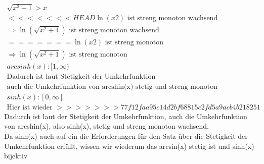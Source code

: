 \documentclass{HM}
\begin{document}
\begin{enumerate}
\begin{enumerate}
	\begin{align*}
		\sqrt{x^2+1} > x\\
<<<<<<< HEAD
		\ln(x2) \text{ ist streng monoton wachsend}\\
		\Rightarrow \ln(\sqrt{x^2+1})\text{ ist streng monoton wachsend}\\
=======
		\ln(x2) \text{ ist streng monoton}\\
		\Rightarrow \ln(\sqrt{x^2+1})\text{ ist streng monoton}\\
		arcsinh(x):[1,\infty)\\
		\text{Dadurch ist laut Stetigkeit der Umkehrfunktion}\\\text{auch die Umkehrfunktion von arcshin(x) stetig und streng monoton}\\
		sinh(x): [0,\infty]\\
		\text{Hier ist wieder }
>>>>>>> 77f12faa95c14d2bf68815c2fd5a9acb4b218251
	\end{align*}
		Dadurch ist laut der Stetigkeit der Umkehrfunktion, auch die Umkehrfunktion von arcshin(x), also sinh(x), stetig und streng monoton wachsend.\\
		Da sinh(x) auch auf ein die Erforderungen für den Satz über die Stetigkeit der Umkehrfunktion erfüllt, wissen wir wiederum das arcsin(x) stetig ist und sinh(x) bijektiv\\
	
\end{enumerate}


\end{enumerate}
\end{document}

